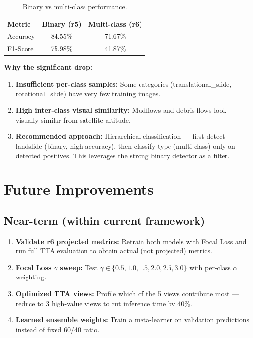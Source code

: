 \documentclass[11pt]{article}
\begin{document}
\begin{table}[H]
    \centering
    \begin{tabular}{lcc}
        \toprule
        \textbf{Metric} & \textbf{Binary (r5)} & \textbf{Multi-class (r6)} \\
        \midrule
        Accuracy & 84.55\% & 71.67\% \\
        F1-Score & 75.98\% & 41.87\% \\
        \bottomrule
    \end{tabular}
    \caption{Binary vs multi-class performance.}
\end{table}

\textbf{Why the significant drop:}
\begin{enumerate}[noitemsep]
    \item \textbf{Insufficient per-class samples:} Some categories (translational\_slide, rotational\_slide) have very few training images.
    \item \textbf{High inter-class visual similarity:} Mudflows and debris flows look visually similar from satellite altitude.
    \item \textbf{Recommended approach:} Hierarchical classification --- first detect landslide (binary, high accuracy), then classify type (multi-class) only on detected positives. This leverages the strong binary detector as a filter.
\end{enumerate}

\section{Future Improvements}

\subsection{Near-term (within current framework)}

\begin{enumerate}
    \item \textbf{Validate r6 projected metrics:} Retrain both models with Focal Loss and run full TTA evaluation to obtain actual (not projected) metrics.
    \item \textbf{Focal Loss $\gamma$ sweep:} Test $\gamma \in \{0.5, 1.0, 1.5, 2.0, 2.5, 3.0\}$ with per-class $\alpha$ weighting.
    \item \textbf{Optimized TTA views:} Profile which of the 5 views contribute most --- reduce to 3 high-value views to cut inference time by 40\%.
    \item \textbf{Learned ensemble weights:} Train a meta-learner on validation predictions instead of fixed 60/40 ratio.
\end{enumerate}
\end{document}
